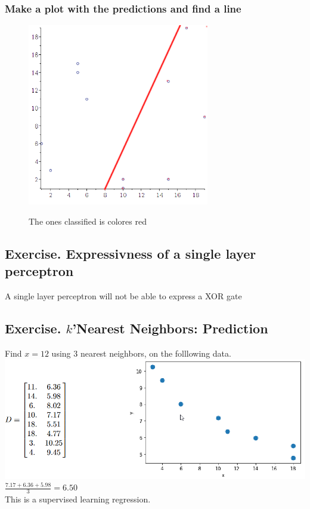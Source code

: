 \documentclass[12pt, a4paper]{article}
\begin{document}
			\subsubsection{Make a plot with the predictions and find a line}
				\begin{figure}[h!]
					\centering
					\includegraphics[width=300px]{images/41,7,4.png}
					\label{41,7,4}
					\caption{The ones classified is colores red}
				\end{figure}
		\subsection{Exercise. Expressivness of a single layer perceptron}
			A single layer perceptron will not be able to express a XOR gate
		\setcounter{subsection}{0}
		\subsection{Exercise. $k$'Nearest Neighbors: Prediction}
			Find $x=12$ using 3 nearest neighbors, on the folllowing data.\\
			\includegraphics[width=\linewidth]{images/41,1,1.png}\\
			$\frac{7.17+6.36+5.98}{3}=6.50$\\
			This is a supervised learning regression.
\end{document}
